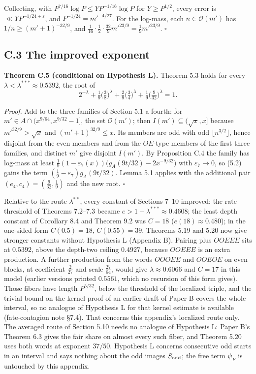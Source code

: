 \documentclass[11pt,a4paper]{article}
\begin{document}
Collecting, with \(P^{7/16}\log P\le YP^{-1/16}\log P\) for
\(Y\ge P^{1/2}\), every error is \(\ll YP^{-1/24+\varepsilon}\), and
\(P^{-1/24}=m'^{-4/27}\). For the log-mass, each \(n\in\mathcal O(m')\)
has \(1/n\ge(m'+1)^{-32/9}\), and
\(\tfrac1{16}\cdot\tfrac12\cdot\tfrac{32}9m'^{23/9}=\tfrac19m'^{23/9}\).
\(\square\)

\subsection{C.3 The improved exponent}\label{c.3-the-improved-exponent}

\textbf{Theorem C.5 (conditional on Hypothesis L).} Theorem 5.3 holds
for every \(\lambda<\lambda^{***}\approx0.5392\), the root of \[
2^{-\lambda}+\tfrac19\bigl(\tfrac38\bigr)^{\lambda}+\tfrac29\bigl(\tfrac34\bigr)^{\lambda}+\tfrac19\bigl(\tfrac9{32}\bigr)^{\lambda}=1 .
\]

\emph{Proof.} Add to the three families of Section 5.1 a fourth: for
\(m'\in A\cap(x^{9/64},x^{9/32}-1]\), the set \(\mathcal O(m')\); then
\(I(m')\subseteq(\sqrt x,x]\) because \(m'^{32/9}>\sqrt x\) and
\((m'+1)^{32/9}\le x\). Its members are odd with odd
\(\lfloor n^{3/2}\rfloor\), hence disjoint from the even members and
from the \(OE\)-type members of the first three families, and distinct
\(m'\) give disjoint \(I(m')\). By Proposition C.4 the family has
log-mass at least
\(\tfrac19(1-\varepsilon_7(x))\bigl(g_A(9t/32)-2x^{-9/32}\bigr)\) with
\(\varepsilon_7\to 0\), so (5.2) gains the term
\((\tfrac19-\varepsilon_7)g_A(9t/32)\). Lemma 5.1 applies with the
additional pair \((e_4,c_4)=(\tfrac9{32},\tfrac19)\) and the new root.
\(\square\)

Relative to the route \(\lambda^{**}\), every constant of Sections 7--10
improved: the rate threshold of Theorems 7.2--7.3 became
\(e>1-\lambda^{***}\approx0.4608\); the least depth constant of
Corollary 8.4 and Theorem 9.2 was \(C=18\) (\(e(18)\approx0.480\)); in
the one-sided form \(C(0.5)=18\), \(C(0.55)=39\). Theorems 5.19 and 5.20
now give stronger constants without Hypothesis L (Appendix B). Pairing
plus \(OOEEE\) sits at \(0.5392\), above the depth-two ceiling
\(0.4927\), because \(OOEEE\) is an extra production. A further
production from the words \(OOOEE\) and \(OOEOE\) on even blocks, at
coefficient \(\tfrac2{27}\) and scale \(\tfrac{27}{64}\), would give
\(\lambda\approx0.6066\) and \(C=17\) in this model (earlier versions
printed \(0.5561\), which no recursion of this form gives). Those fibers
have length \(P^{5/32}\), below the threshold of the localized triple,
and the trivial bound on the kernel proof of an earlier draft of Paper B
covers the whole interval, so no analogue of Hypothesis L for that
kernel estimate is available (fate-contagion note §7.4). That concerns
this appendix's localized route only. The averaged route of Section 5.10
needs no analogue of Hypothesis L: Paper B's Theorem 6.3 gives the fair
share on almost every such fiber, and Theorem 5.20 uses both words at
exponent \(37/50\). Hypothesis L concerns consecutive odd starts in an
interval and says nothing about the odd images \(S_{\rm odd}\); the free
term \(\psi_F\) is untouched by this appendix.
\end{document}
